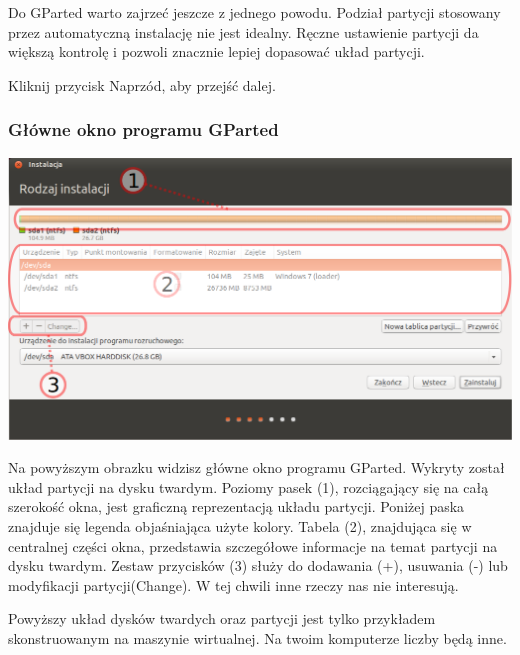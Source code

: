 Do GParted warto zajrzeć jeszcze z jednego powodu. Podział partycji stosowany przez automatyczną instalację nie jest idealny. Ręczne ustawienie partycji da większą kontrolę i pozwoli znacznie lepiej dopasować układ partycji.
\begin{flushright}
Kliknij przycisk \textcolor{ubuntu_orange}{Naprzód}, aby przejść dalej.
\end{flushright}

\subsubsection{Główne okno programu GParted}
\begin{center}
        \includegraphics[width=\linewidth]{images/instalator_partycjonowanie_gparted2.png}
\end{center}

Na powyższym obrazku widzisz główne okno programu GParted. Wykryty został układ partycji na dysku twardym. Poziomy pasek \textcolor{ubuntu_orange}{(}1\textcolor{ubuntu_orange}{)}, rozciągający się na całą szerokość okna, jest graficzną reprezentacją układu partycji. Poniżej paska znajduje się legenda objaśniająca użyte kolory. Tabela \textcolor{ubuntu_orange}{(}2\textcolor{ubuntu_orange}{)}, znajdująca się w centralnej części okna, przedstawia szczegółowe informacje na temat partycji na dysku twardym. Zestaw przycisków \textcolor{ubuntu_orange}{(}3\textcolor{ubuntu_orange}{)} służy do dodawania (\textcolor{ubuntu_orange}{+}), usuwania (\textcolor{ubuntu_orange}{-}) lub modyfikacji partycji(\textcolor{ubuntu_orange}{Change}). W tej chwili inne rzeczy nas nie interesują.

Powyższy układ dysków twardych oraz partycji jest tylko przykładem skonstruowanym na maszynie wirtualnej. Na twoim komputerze liczby będą inne.

